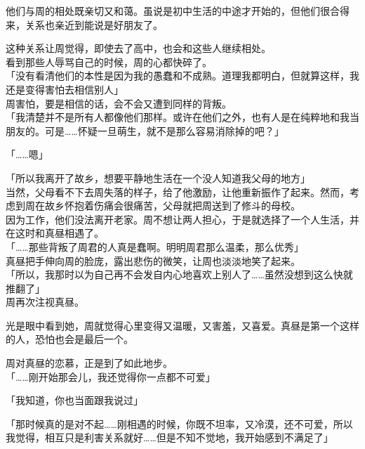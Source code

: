 他们与周的相处既亲切又和蔼。虽说是初中生活的中途才开始的，但他们很合得来，关系也亲近到能说是好朋友了。

这种关系让周觉得，即使去了高中，也会和这些人继续相处。\\

看到那些人辱骂自己的时候，周的心都快碎了。\\

「没有看清他们的本性是因为我的愚蠢和不成熟。道理我都明白，但就算这样，我还是变得害怕去相信别人」\\

周害怕，要是相信的话，会不会又遭到同样的背叛。\\

「我清楚并不是所有人都像他们那样。或许在他们之外，也有人是在纯粹地和我当朋友的。可是……怀疑一旦萌生，就不是那么容易消除掉的吧？」

「……嗯」

「所以我离开了故乡，想要平静地生活在一个没人知道我父母的地方」\\

当然，父母看不下去周失落的样子，给了他激励，让他重新振作了起来。然而，考虑到周在故乡怀抱着伤痛会很痛苦，父母就把周送到了修斗的母校。\\

因为工作，他们没法离开老家。周不想让两人担心，于是就选择了一个人生活，并在这时和真昼相遇了。\\

「……那些背叛了周君的人真是蠢啊。明明周君那么温柔，那么优秀」\\

真昼把手伸向周的脸庞，露出悲伤的微笑，让周也淡淡地笑了起来。\\

「所以，我那时以为自己再不会发自内心地喜欢上别人了……虽然没想到这么快就推翻了」\\

周再次注视真昼。

光是眼中看到她，周就觉得心里变得又温暖，又害羞，又喜爱。真昼是第一个这样的人，恐怕也会是最后一个。

周对真昼的恋慕，正是到了如此地步。\\

「……刚开始那会儿，我还觉得你一点都不可爱」

「我知道，你也当面跟我说过」

「那时候真的是对不起……刚相遇的时候，你既不坦率，又冷漠，还不可爱，所以我觉得，相互只是利害关系就好……但是不知不觉地，我开始感到不满足了」\\


